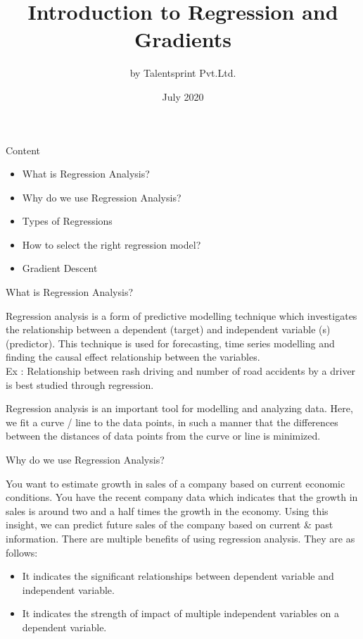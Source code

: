 \documentclass{beamer}
\title{Introduction to Regression and Gradients}
\author{by Talentsprint Pvt.Ltd.}
\date{July 2020}
\begin{document}
\maketitle
\begin{frame}{Content}
	\begin{itemize}
		\item What is Regression Analysis?
		\item Why do we use Regression Analysis?
		\item Types of Regressions
		\item How to select the right regression model?
		\item Gradient Descent
	\end{itemize}
\end{frame}

\begin{frame}{What is Regression Analysis?}
\begin{flushleft}
	Regression analysis is a form of predictive modelling technique which investigates the relationship between a dependent (target) and independent variable (s) (predictor). This technique is used for forecasting, time series modelling and finding the causal effect relationship between the variables. 
\\
\vspace{10pt}
	Ex : Relationship between rash driving and number of road accidents by a driver is best studied through regression.
\vspace{10pt}

Regression analysis is an important tool for modelling and analyzing data. Here, we fit a curve / line to the data points, in such a manner that the differences between the distances of data points from the curve or line is minimized.  

\end{flushleft}
\end{frame}

\begin{frame}{Why do we use Regression Analysis?}
	\begin{flushleft}
		You want to estimate growth in sales of a company based on current economic conditions. You have the recent company data which indicates that the growth in sales is around two and a half times the growth in the economy. Using this insight, we can predict future sales of the company based on current \& past information.
\vspace{10pt}
There are multiple benefits of using regression analysis. They are as follows:
	\begin{itemize}
	\item It indicates the significant relationships between dependent variable and independent variable.
	\item It indicates the strength of impact of multiple independent variables on a dependent variable.
\end{itemize}
	\end{flushleft}
\end{frame}
\end{document}
